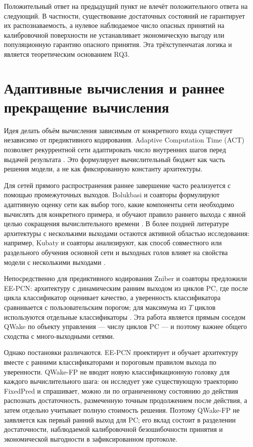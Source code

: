 Положительный ответ на предыдущий пункт не влечёт положительного ответа на
следующий. В частности, существование достаточных состояний не гарантирует их
распознаваемость, а нулевое наблюдаемое число опасных принятий на калибровочной
поверхности не устанавливает экономическую выгоду или популяционную гарантию
опасного принятия. Эта трёхступенчатая логика и является теоретическим основанием RQ3.

\section{Адаптивные вычисления и раннее прекращение вычисления}
\label{sec:related-adaptive-computation}

Идея делать объём вычисления зависимым от конкретного входа существует
независимо от предиктивного кодирования. Adaptive Computation Time (ACT)
позволяет рекуррентной сети адаптировать число внутренних шагов перед выдачей
результата \cite{graves2016adaptive}. Это формулирует вычислительный бюджет как
часть решения модели, а не как фиксированную константу архитектуры.

Для сетей прямого распространения раннее завершение часто реализуется с помощью
промежуточных выходов. Bolukbasi и соавторы формулируют адаптивную оценку сети
как выбор того, какие компоненты сети необходимо вычислять для конкретного
примера, и обучают правило раннего выхода с явной целью сокращения
вычислительного времени \cite{bolukbasi2017adaptive}. В более поздней литературе
архитектуры с несколькими выходами остаются активной областью исследования:
например, Kubaty и соавторы анализируют, как способ совместного или раздельного
обучения основной сети и выходных голов влияет на свойства модели с несколькими
выходами \cite{kubaty2025multiexit}.

Непосредственно для предиктивного кодирования Zniber и соавторы предложили EE-PCN:
архитектуру с динамическим ранним выходом из циклов PC, где после цикла
классификатор оценивает качество, а уверенность классификатора сравнивается с пользовательским
порогом; для максимума из $T$ циклов используются отдельные классификаторы
\cite{zniber2025earlyexit}. Эта работа является прямым соседом QWake по объекту
управления --- числу циклов PC --- и поэтому важнее общего сходства с
много-выходными сетями.

Однако постановки различаются. EE-PCN проектирует и обучает архитектуру вместе с
ранними классификаторами и пороговым правилом выхода по уверенности. QWake-FP не вводит
новую классификационную головку для каждого вычислительного шага: он исследует
уже существующую траекторию FixedPred и спрашивает, можно ли по ограниченному
состоянию до действия распознать достаточность, размеченную точным продолжением
после действия, а затем отдельно учитывает полную стоимость решения. Поэтому
QWake-FP не заявляется как первый ранний выход для PC; его вклад состоит в
разделении достаточности, наблюдаемой калибровочной безошибочности принятия и
экономической выгодности в зафиксированном протоколе.

